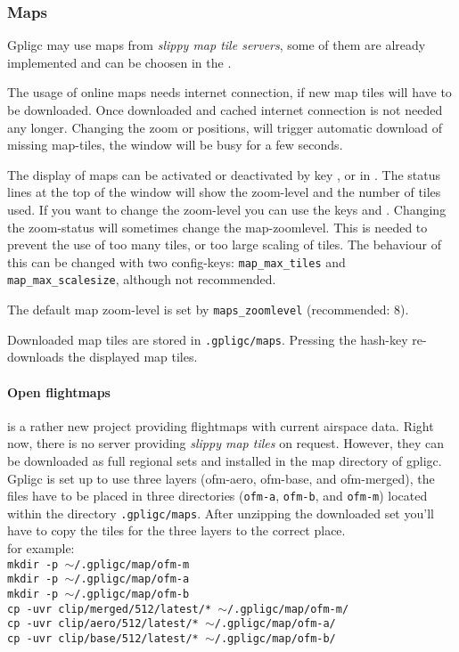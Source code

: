 \subsubsection{Maps}
Gpligc may use maps from \emph{slippy map tile servers}, some of them are already implemented and can be choosen in the .

The usage of online maps needs internet connection, if new map tiles will have to be downloaded. Once downloaded and cached internet connection is not needed any longer.
Changing the zoom or positions, will trigger automatic download of missing map-tiles, the window will be busy for a few seconds.

The display of maps can be activated or deactivated by key , or in .
The status lines at the top of the window will show the zoom-level and the number of tiles used.
If you want to change the zoom-level you can use the keys \keys{{+}} and \keys{--}.
Changing the zoom-status will sometimes change the map-zoomlevel. This is needed to prevent
the use of too many tiles, or too large scaling of tiles.
The behaviour of this can be changed with two config-keys:
\texttt{map\_max\_tiles}
and \texttt{map\_max\_scalesize}, although not recommended.

The default map zoom-level is set by \texttt{maps\_zoomlevel} (recommended: 8).

Downloaded map tiles are stored in \texttt{.gpligc/maps}. Pressing the hash-key \keys{\#} re-downloads the displayed map tiles.

\paragraph{Open flightmaps}
is a rather new project \cite{ofm} providing flightmaps with current airspace data. Right now, there is no server providing \emph{slippy map tiles} on request. However, they can be downloaded as full regional sets and installed in the map directory of gpligc.
Gpligc is set up to use three layers (ofm-aero, ofm-base, and ofm-merged), the files have to be placed in three directories (\texttt{ofm-a}, \texttt{ofm-b}, and \texttt{ofm-m}) located within the directory \texttt{.gpligc/maps}.
After unzipping the downloaded set you'll have to copy the tiles for the three layers to the correct place.\\
for example:\\
\texttt{mkdir -p $\sim$/.gpligc/map/ofm-m}\\
\texttt{mkdir -p $\sim$/.gpligc/map/ofm-a}\\
\texttt{mkdir -p $\sim$/.gpligc/map/ofm-b}\\
\texttt{cp -uvr clip/merged/512/latest/* $\sim$/.gpligc/map/ofm-m/}\\
\texttt{cp -uvr clip/aero/512/latest/* $\sim$/.gpligc/map/ofm-a/}\\
\texttt{cp -uvr clip/base/512/latest/* $\sim$/.gpligc/map/ofm-b/}\\





